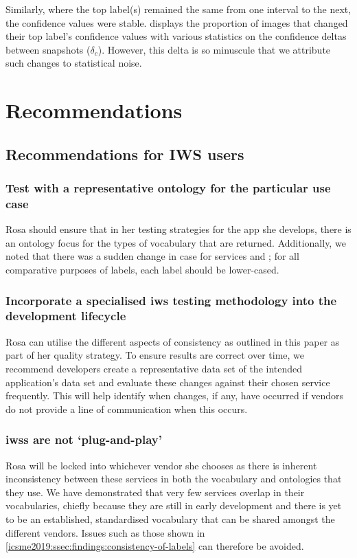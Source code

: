 Similarly, where the top label(s) remained the same from one interval to the next, the confidence values were stable.  displays the proportion of images that changed their top label's confidence values with various statistics on the confidence deltas between snapshots ($\delta_{c}$). However, this delta is so minuscule that we attribute such changes to statistical noise.

\section{Recommendations}
\label{icsme2019:sec:recommendations}

\subsection{Recommendations for IWS users}

\subsubsection{Test with a representative ontology for the particular use case}
Rosa should ensure that in her testing strategies for the app she develops, there is an ontology focus for the types of vocabulary that are returned. Additionally, we noted that there was a sudden change in case for services \googleapi{} and \awsapi{}; for all comparative purposes of labels, each label should be lower-cased. 

\subsubsection{Incorporate a specialised \gls{iws} testing methodology into the development lifecycle}
Rosa can utilise the different aspects of consistency as outlined in this paper as part of her quality strategy. To ensure results are correct over time, we recommend developers create a representative data set of the intended application's data set and evaluate these changes against their chosen service frequently. This will help identify when changes, if any, have occurred if vendors do not provide a line of communication when this occurs.

\subsubsection{\glspl{iws} are not `plug-and-play'}
Rosa will be locked into whichever vendor she chooses as there is inherent inconsistency between these services in both the vocabulary and ontologies that they use. We have demonstrated that very few services overlap in their vocabularies, chiefly because they are still in early development and there is yet to be an established, standardised vocabulary that can be shared amongst the different vendors.
 Issues such as those shown in \cref{icsme2019:ssec:findings:consistency-of-labels} can therefore be avoided.
 
